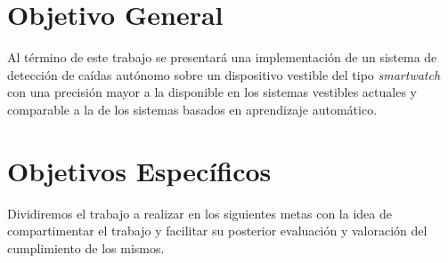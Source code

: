 \begin{comment}
Puente entre el estudio y la contribución. Debe contener:
 * objetivo general
 * objetivo específico
 * metodología de trabajo
 
Los objetivos deben ser \textit{SMART}

Specificl (objetivo claro)
Measurable (se pueda medir el éxito o fracaso)
Attainable (viable su conecución con el tiempo y recursos disponibles)
Relevant (que tenga un impacto demostrable)
Time-related (que se pueda realizar en un tiempo determinado)

Objetivos secundarios:
Conjunto de objetivos más específicos alcanzables por separado. suelen ser los diferentes pasos a seguir para conseguir el objetivo general. Han de ser smart, los verbos deberían ser:     • Analizar
Calcular
Clasificar
Comparar
Conocer
Cuantificar
Desarrollar
Describir
Descubrir
Determinar
Establecer
Explorar
Identificar
Indagar
Medir
Sintetizar
Verificar

Objetivo general
Un poco la descripción a grandes rasgos de qué se espera explicado al público general.
Ejemplo: Mejorar el servicio de audio gruía de un museo con una guía interactiva por voz valorada positivamente con un 4/5 al menos.

\end{comment}

\section{Objetivo General}\label{sec:obj:objetivo_general}
Al término de este trabajo se presentará una implementación de un sistema de detección de caídas autónomo sobre un dispositivo vestible del tipo \textit{smartwatch} con una precisión mayor a la disponible en los sistemas vestibles actuales y comparable a la de los sistemas basados en aprendizaje automático.

\section{Objetivos Específicos}\label{sec:obj:objetivos_especificos}
Dividiremos el trabajo a realizar en los siguientes metas con la idea de compartimentar el trabajo y facilitar su posterior evaluación y valoración del cumplimiento de los mismos.

